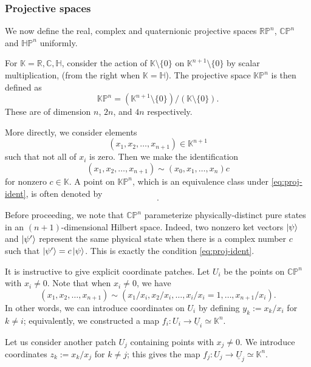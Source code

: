 \documentclass[12pt]{article}
\numberwithin{equation}{section}
\def\bC{\mathbb{C}}
\def\bH{\mathbb{H}}
\def\bK{\mathbb{K}}
\def\bR{\mathbb{R}}
\def\RP{\mathbb{RP}}
\def\CP{\mathbb{CP}}
\def\HP{\mathbb{HP}}
\def\KP{\mathbb{KP}}
\begin{document}
\subsubsection{Projective spaces}
We now define the real, complex and quaternionic projective spaces $\RP^n$, $\CP^n$ and $\HP^n$ uniformly.
\begin{example}
  \label{ex:proj}
  For $\bK=\bR,\bC,\bH$, 
  consider the action of $\bK\setminus \{0\}$ on
  $\bK^{n+1}\setminus\{0\}$ by scalar multiplication, (from the right when $\bK=\bH$).
  The projective space $\KP^n$ is then defined as
  \begin{equation}
    \KP^n = (\bK^{n+1}\setminus\{0\})/(\bK\setminus\{0\}).
  \end{equation}
  These are of dimension $n$, $2n$, and $4n$ respectively.
\end{example}
More directly, we consider elements 
\begin{equation}
(x_1,x_2,\ldots,x_{n+1})\in \bK^{n+1}
\end{equation} such that not all of $x_i$ is zero.
Then we make the identification \begin{equation}
  (x_1,x_2,\ldots,x_{n+1}) \sim  ( x_0, x_1, \ldots,  x_n)c \label{eq:proj-ident}
\end{equation} for nonzero $c\in \bK$.
A point on $\KP^n$,
which is an equivalence class under \eqref{eq:proj-ident},
is often denoted by \begin{equation}
  [x_1:x_2:\cdots:x_{n+1}].
\end{equation}

Before proceeding, we note that $\CP^n$ parameterize physically-distinct pure states 
in an $(n+1)$-dimensional Hilbert space.
Indeed, two nonzero ket vectors $\ket{\psi}$ and $\ket{\psi'}$ represent the same physical state
when there is a complex number $c$ such that $\ket{\psi'}=c\ket{\psi}$.
This is exactly the condition \eqref{eq:proj-ident}.

It is instructive to give explicit coordinate patches.
Let $U_i$ be the points on $\CP^n$ with $x_i\neq 0$.
Note that when $x_i\neq 0$, we have \begin{equation}
  (x_1,x_2,\ldots,x_{n+1}) \sim (x_1/x_i, x_2/x_i, \ldots, x_i/x_i=1, \ldots, x_{n+1}/x_i).
\end{equation} 
In other words, we can introduce coordinates on $U_i$ by defining  $y_k:=x_k/x_i$ for $k\neq i$;
equivalently, we constructed a map $f_i: U_i \to \underline{U}_i \simeq \bK^n$.

Let us consider another patch $U_j$ containing points with $x_j\neq 0$. 
We introduce coordinates $z_k:=x_k/x_j$ for $k\neq j$;
this gives the map $f_j: U_j \to \underline{U}_j\simeq \bK^n$.
\end{document}
